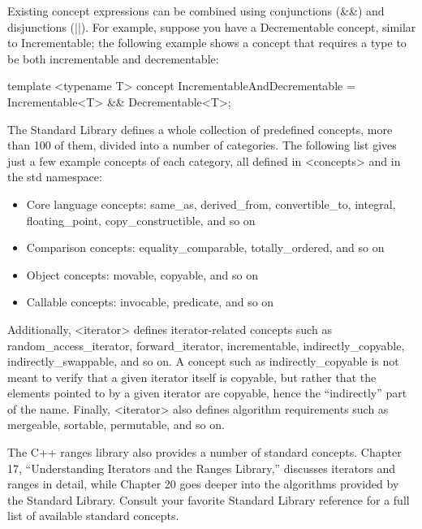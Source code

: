 Existing concept expressions can be combined using conjunctions (\&\&) and disjunctions (||). For example, suppose you have a Decrementable concept, similar to Incrementable; the following example shows a concept that requires a type to be both incrementable and decrementable:

\begin{cpp}
template <typename T>
concept IncrementableAndDecrementable = Incrementable<T> && Decrementable<T>;
\end{cpp}


The Standard Library defines a whole collection of predefined concepts, more than 100 of them, divided into a number of categories. The following list gives just a few example concepts of each category, all defined in <concepts> and in the std namespace:

\begin{itemize}
\item
Core language concepts: same\_as, derived\_from, convertible\_to, integral, floating\_point, copy\_constructible, and so on

\item
Comparison concepts: equality\_comparable, totally\_ordered, and so on

\item
Object concepts: movable, copyable, and so on

\item
Callable concepts: invocable, predicate, and so on
\end{itemize}

Additionally, <iterator> defines iterator-related concepts such as random\_access\_iterator, forward\_iterator, incrementable, indirectly\_copyable, indirectly\_swappable, and so on. A concept such as indirectly\_copyable is not meant to verify that a given iterator itself is copyable, but rather that the elements pointed to by a given iterator are copyable, hence the “indirectly” part of the name. Finally, <iterator> also defines algorithm requirements such as mergeable, sortable, permutable, and so on.

The C++ ranges library also provides a number of standard concepts. Chapter 17, “Understanding Iterators and the Ranges Library,” discusses iterators and ranges in detail, while Chapter 20 goes deeper into the algorithms provided by the Standard Library. Consult your favorite Standard Library reference for a full list of available standard concepts.

